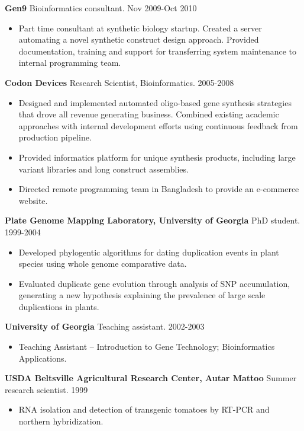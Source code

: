 \documentclass[10pt]{article}
\begin{document}
\textbf{Gen9} Bioinformatics consultant. Nov 2009-Oct 2010
\begin{itemize}
  \item[] Part time consultant at synthetic biology startup. Created a server
    automating a novel synthetic construct design approach.
    Provided documentation, training and support for transferring system
    maintenance to internal programming team.
\end{itemize}

\textbf{Codon Devices} Research Scientist, Bioinformatics. 2005-2008
\begin{itemize}
  \item Designed and implemented automated oligo-based gene synthesis
  strategies that drove all revenue generating business. Combined
  existing academic approaches with internal development efforts using
  continuous feedback from production pipeline.
  \item Provided informatics platform for unique synthesis products, including
  large variant libraries and long construct assemblies.
  \item Directed remote programming team in Bangladesh
    to provide an e-commerce website.
\end{itemize}

\textbf{Plate Genome Mapping Laboratory, University of Georgia} PhD student. 1999-2004
\begin{itemize}
  \item Developed phylogentic algorithms for dating duplication events
  in plant species using whole genome comparative data.
  \item Evaluated duplicate gene evolution through analysis of SNP
  accumulation, generating a new hypothesis explaining the prevalence of
  large scale duplications in plants.
\end{itemize}

\textbf{University of Georgia} Teaching assistant. 2002-2003
\begin{itemize}
  \item[] Teaching Assistant -- Introduction to Gene Technology; Bioinformatics Applications.
\end{itemize}

\textbf{USDA Beltsville Agricultural Research Center, Autar Mattoo} Summer research scientist. 1999
\begin{itemize}
  \item[] RNA isolation and detection of transgenic tomatoes by RT-PCR and
  northern hybridization.
\end{itemize}
\end{document}

